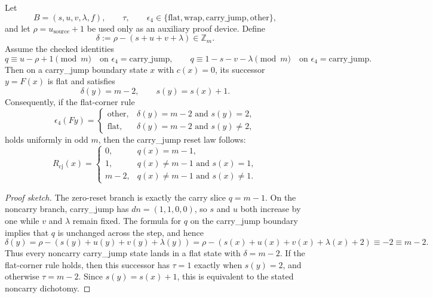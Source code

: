 
\begin{proposition}
Let
\[
B=(s,u,v,\lambda,f),\qquad \tau,\qquad \epsilon_4\in\{\mathrm{flat},\mathrm{wrap},\mathrm{carry\_jump},\mathrm{other}\},
\]
and let \(\rho=u_{\mathrm{source}}+1\) be used only as an auxiliary proof device.
Define
\[
\delta:=\rho-(s+u+v+\lambda)\in\mathbb Z_m.
\]
Assume the checked identities
\[
q\equiv u-\rho+1 \pmod m
\quad\text{on }\epsilon_4=\mathrm{carry\_jump},
\qquad
q\equiv 1-s-v-\lambda \pmod m
\quad\text{on }\epsilon_4=\mathrm{carry\_jump}.
\]
Then on a carry\_jump boundary state \(x\) with \(c(x)=0\), its successor
\(y=F(x)\) is flat and satisfies
\[
\delta(y)=m-2,
\qquad
s(y)=s(x)+1.
\]
Consequently, if the flat-corner rule
\[
\epsilon_4(Fy)=
\begin{cases}
\mathrm{other},& \delta(y)=m-2 \text{ and } s(y)=2,\\
\mathrm{flat},& \delta(y)=m-2 \text{ and } s(y)\neq 2,
\end{cases}
\]
holds uniformly in odd \(m\), then the carry\_jump reset law follows:
\[
R_{\mathrm{cj}}(x)=
\begin{cases}
0,& q(x)=m-1,\\
1,& q(x)\neq m-1 \text{ and } s(x)=1,\\
m-2,& q(x)\neq m-1 \text{ and } s(x)\neq 1.
\end{cases}
\]
\end{proposition}

\begin{proof}[Proof sketch]
The zero-reset branch is exactly the carry slice \(q=m-1\).  On the noncarry
branch, carry\_jump has \(dn=(1,1,0,0)\), so \(s\) and \(u\) both increase by one
while \(v\) and \(\lambda\) remain fixed.  The formula for \(q\) on the
carry\_jump boundary implies that \(q\) is unchanged across the step, and hence
\[
\delta(y)=\rho-(s(y)+u(y)+v(y)+\lambda(y))
=\rho-(s(x)+u(x)+v(x)+\lambda(x)+2)
\equiv -2\equiv m-2.
\]
Thus every noncarry carry\_jump state lands in a flat state with
\(\delta=m-2\).  If the flat-corner rule holds, then this successor has
\(\tau=1\) exactly when \(s(y)=2\), and otherwise \(\tau=m-2\).  Since
\(s(y)=s(x)+1\), this is equivalent to the stated noncarry dichotomy.
\end{proof}
